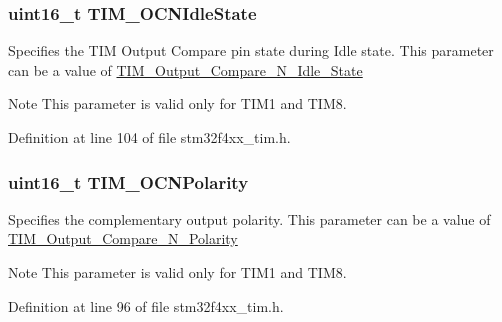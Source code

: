 \hypertarget{struct_t_i_m___o_c_init_type_def_a68f0241aa8d57bb42cd8e56c153f8e48}{
\subsubsection[{T\-I\-M\-\_\-\-O\-C\-N\-Idle\-State}]{\setlength{\rightskip}{0pt plus 5cm}uint16\-\_\-t T\-I\-M\-\_\-\-O\-C\-N\-Idle\-State}}\label{struct_t_i_m___o_c_init_type_def_a68f0241aa8d57bb42cd8e56c153f8e48}
Specifies the T\-I\-M Output Compare pin state during Idle state. This parameter can be a value of \hyperlink{group___t_i_m___output___compare___n___idle___state}{T\-I\-M\-\_\-\-Output\-\_\-\-Compare\-\_\-\-N\-\_\-\-Idle\-\_\-\-State} \begin{DoxyNote}{Note}
This parameter is valid only for T\-I\-M1 and T\-I\-M8. 
\end{DoxyNote}


Definition at line 104 of file stm32f4xx\-\_\-tim.\-h.

\hypertarget{struct_t_i_m___o_c_init_type_def_aa392739b843a7974702c5ec71864f982}{
\subsubsection[{T\-I\-M\-\_\-\-O\-C\-N\-Polarity}]{\setlength{\rightskip}{0pt plus 5cm}uint16\-\_\-t T\-I\-M\-\_\-\-O\-C\-N\-Polarity}}\label{struct_t_i_m___o_c_init_type_def_aa392739b843a7974702c5ec71864f982}
Specifies the complementary output polarity. This parameter can be a value of \hyperlink{group___t_i_m___output___compare___n___polarity}{T\-I\-M\-\_\-\-Output\-\_\-\-Compare\-\_\-\-N\-\_\-\-Polarity} \begin{DoxyNote}{Note}
This parameter is valid only for T\-I\-M1 and T\-I\-M8. 
\end{DoxyNote}


Definition at line 96 of file stm32f4xx\-\_\-tim.\-h.

